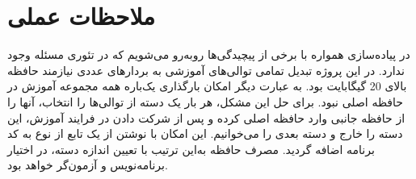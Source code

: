 \section{ملاحظات عملی}
در پیاده‌سازی همواره با برخی از پیچید‌گی‌ها روبه‌رو می‌شویم که در تئوری مسئله وجود ندارد. در این پروژه تبدیل تمامی توالی‌های آموزشی به بردار‌های عددی نیازمند حافظه‌‌ بالای 20 گیگابایت بود. به عبارت دیگر امکان بارگذاری یک‌باره همه مجموعه آموزش در حافظه اصلی نبود.
برای حل این مشکل، هر بار یک دسته از توالی‌ها را انتخاب، آنها را از حافظه‌ جانبی وارد حافظه‌ اصلی کرده و پس از شرکت دادن در فرایند آموزش، این دسته را خارج و دسته بعدی را می‌خوانیم. این امکان با نوشتن از یک تابع از نوع   به کد برنامه اضافه گردید. مصرف حافظه به‌این ترتیب با تعیین اندازه دسته، در اختیار برنامه‌نویس و آزمون‌گر خواهد بود.










